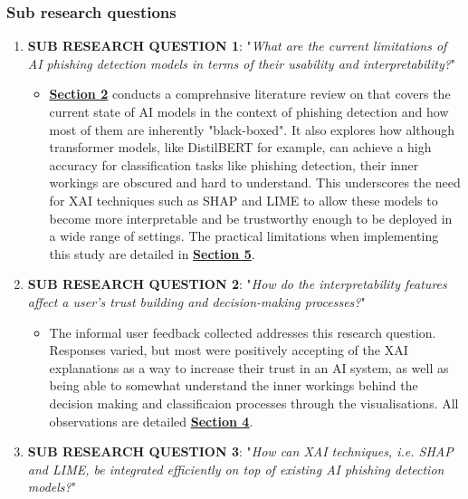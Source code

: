 
\subsubsection*{Sub research questions}

\begin{enumerate}
  \item \textbf{SUB RESEARCH QUESTION 1}: "\textit{What are the current limitations of AI phishing detection models in terms of their usability and interpretability?}"
  \begin{itemize}
    \item \hyperref[sec:2-literature-review]{\uline{\textbf{Section 2}}} conducts a comprehnsive literature review on that covers the current state of AI models in the context of phishing detection and how most of them are inherently "black-boxed". It also explores how although transformer models, like DistilBERT for example, can achieve a high accuracy for classification tasks like phishing detection, their inner workings are obscured and hard to understand. This underscores the need for XAI techniques such as SHAP and LIME to allow these models to become more interpretable and be trustworthy enough to be deployed in a wide range of settings. The practical limitations when implementing this study are detailed in \hyperref[sec:5-discussion]{\uline{\textbf{Section 5}}}.
  \end{itemize}
  \item \textbf{SUB RESEARCH QUESTION 2}: "\textit{How do the interpretability features affect a user's trust building and decision-making processes?}"
  \begin{itemize}
    \item The informal user feedback collected addresses this research question. Responses varied, but most were positively accepting of the XAI explanations as a way to increase their trust in an AI system, as well as being able to somewhat understand the inner workings behind the decision making and classificaion processes through the visualisations. All observations are detailed \hyperref[sec:4-results]{\uline{\textbf{Section 4}}}.
  \end{itemize}
  \item \textbf{SUB RESEARCH QUESTION 3}: "\textit{How can XAI techniques, i.e. SHAP and LIME, be integrated efficiently on top of existing AI phishing detection models?}"

\end{enumerate}
